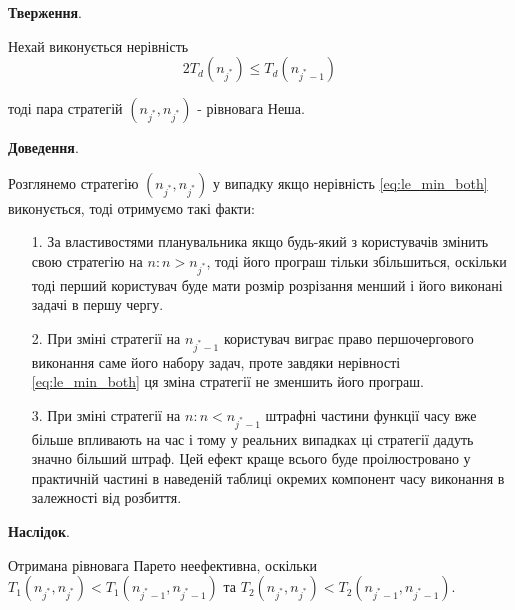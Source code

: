 \textbf{Тверження}.

Нехай виконується нерівність
\begin{equation}
	2T_d(n_{j^*}) \le T_d(n_{{j^*}-1})
	\label{eq:le_min_both}
\end{equation}

тоді пара стратегій $(n_{j^*},n_{j^*})$ - рівновага Неша.

\textbf{Доведення}.

Розглянемо стратегію $(n_{j^*},n_{j^*})$ у випадку якщо нерівність \ref{eq:le_min_both} виконується, тоді отримуємо такі факти:
\begin{itemize}
	\item[1.] За властивостями планувальника якщо будь-який з користувачів змінить свою стратегію на $n: n > n_{j^*}$, тоді його програш тільки збільшиться, оскільки тоді перший користувач буде мати розмір розрізання менший і його виконані задачі в першу чергу.
	
	\item[2.] При зміні стратегії на $n_{j^*-1}$ користувач виграє право першочергового виконання саме його набору задач, проте завдяки нерівності \ref{eq:le_min_both} ця зміна стратегії не зменшить його програш.
	
	\item[3.] При зміні стратегії на $n: n < n_{j^* - 1}$ штрафні частини функції часу вже більше впливають на час і тому у реальних випадках ці стратегії дадуть значно більший штраф. Цей ефект краще всього буде проілюстровано у практичній частині в наведеній таблиці окремих компонент часу виконання в залежності від розбиття.
\end{itemize}

\textbf{Наслідок}.

Отримана рівновага Парето неефективна, оскільки $T_1(n_{j^*},n_{j^*}) < T_1(n_{j^*-1},n_{j^*-1})$ та $T_2(n_{j^*},n_{j^*}) < T_2(n_{j^*-1},n_{j^*-1})$.




 